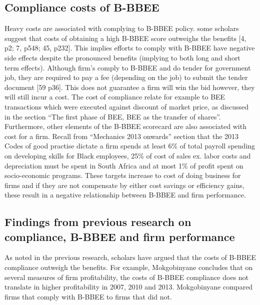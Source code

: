 \subsection{Compliance costs of B-BBEE}
Heavy costs are associated with complying to B-BBEE policy. some scholars suggest that costs of obtaining a high B-BBEE score outweighs the benefits [4, p2; 7, p548; 45, p232]. This implies efforts to comply with B-BBEE have negative side effects despite the pronounced benefits (implying to both long and short term effects). Although firm’s comply to B-BBEE and do tender for government job, they are required to pay a fee (depending on the job) to submit the tender document [59 p36]. This does not guarantee a firm will win the bid however, they will still incur a cost. The cost of compliance relate for example to BEE transactions which were executed against discount of market price, as discussed in the section “The first phase of BEE, BEE as the transfer of shares”. Furthermore, other elements of the B-BBEE scorecard are also associated with cost for a firm. Recall from “Mechanics 2013 onwards” section that the 2013 Codes of good practise dictate a firm spends at least 6\% of total payroll spending on developing skills for Black employees, 25\% of cost of sales ex. labor costs and depreciation must be spent in South Africa and at most 1\% of profit spent on socio-economic programs. These targets increase to cost of doing business for firms and if they are not compensate by either cost savings or efficiency gains, these result in a negative relationship between B-BBEE and firm performance.
\subsection{Findings from previous research on compliance, B-BBEE and firm performance}
As noted in the previous research, scholars have argued that the costs of B-BBEE compliance outweigh the benefits. For example, Mokgobinyane concludes that on several measures of firm profitability, the costs of B-BBEE compliance does not translate in higher profitability in 2007, 2010 and 2013. Mokgobinyane compared firms that comply with B-BBEE to firms that did not.

